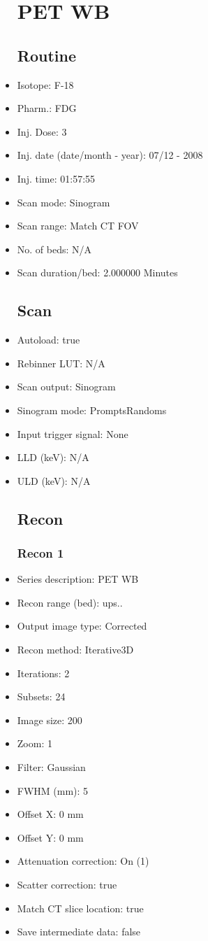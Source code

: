 \documentclass[12pt]{article}
\begin{document}
\begin{itemize}
\section{PET WB}
\subsection{Routine}
\item Isotope: F-18
\item Pharm.: FDG
\item Inj. Dose: 3 
\item Inj. date (date/month - year): 07/12 - 2008
\item Inj. time: 01:57:55
\item Scan mode: Sinogram
\item Scan range: Match CT FOV
\item No. of beds: N/A
\item Scan duration/bed: 2.000000 Minutes
\subsection{Scan}
\item Autoload: true
\item Rebinner LUT: N/A
\item Scan output: Sinogram
\item Sinogram mode: PromptsRandoms
\item Input trigger signal: None
\item LLD (keV): N/A
\item ULD (keV): N/A
\subsection{Recon}

\subsubsection{Recon 1}
\item Series description: PET WB
\item Recon range (bed): ups..
\item Output image type: Corrected
\item Recon method: Iterative3D
\item Iterations: 2
\item Subsets: 24
\item Image size: 200
\item Zoom: 1
\item Filter: Gaussian
\item FWHM (mm): 5
\item Offset X: 0 mm
\item Offset Y: 0 mm
\item Attenuation correction: On (1)
\item Scatter correction: true
\item Match CT slice location: true
\item Save intermediate data: false

\end{itemize}
\end{document}
